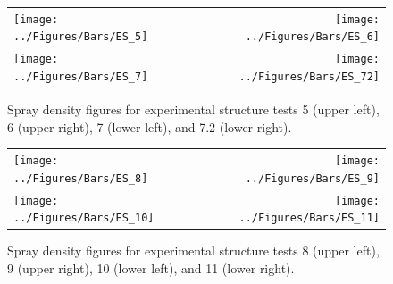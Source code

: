 \documentclass[12pt,oneside]{book}
\begin{document}
\clearpage

\begin{figure}[ht]
\begin{tabular*}{\textwidth}{lr}
\texttt{[image: ../Figures/Bars/ES\_5]} &
\texttt{[image: ../Figures/Bars/ES\_6]} \\
\texttt{[image: ../Figures/Bars/ES\_7]} &
\texttt{[image: ../Figures/Bars/ES\_72]}
\end{tabular*}
\caption{Spray density figures for experimental structure tests 5 (upper left), 6 (upper right), 7 (lower left), and 7.2 (lower right).}
\label{fig:es_5_72}
\end{figure}

\clearpage

\begin{figure}[ht]
\begin{tabular*}{\textwidth}{lr}
\texttt{[image: ../Figures/Bars/ES\_8]} &
\texttt{[image: ../Figures/Bars/ES\_9]} \\
\texttt{[image: ../Figures/Bars/ES\_10]} &
\texttt{[image: ../Figures/Bars/ES\_11]}
\end{tabular*}
\caption{Spray density figures for experimental structure tests 8 (upper left), 9 (upper right), 10 (lower left), and 11 (lower right).}
\label{fig:es_8_11}
\end{figure}
\end{document}
